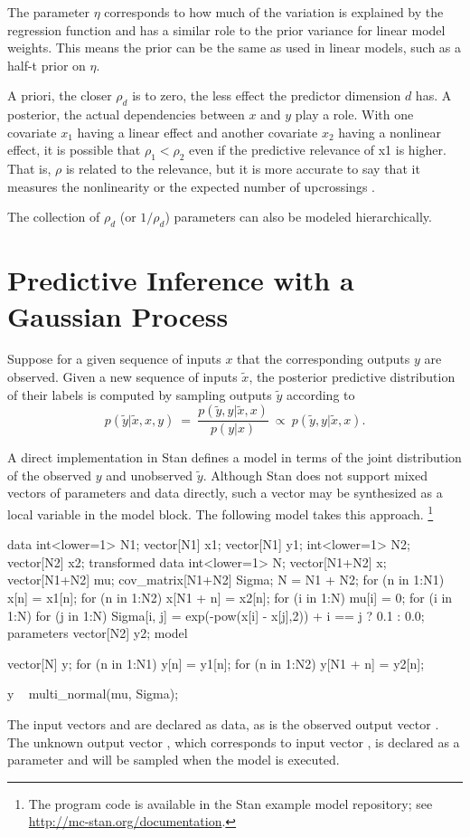 The parameter $\eta$ corresponds to how much of the variation is
explained by the regression function and has a similar role to the
prior variance for linear model weights.  This means the prior can be
the same as used in linear models, such as a half-t prior on $\eta$.

A priori, the closer $\rho_d$ is to zero, the less effect the
predictor dimension $d$ has.  A posterior, the actual dependencies
between $x$ and $y$ play a role.  With one covariate $x_1$ having a
linear effect and another covariate $x_2$ having a nonlinear effect,
it is possible that $\rho_1 < \rho_2$ even if the predictive relevance
of x1 is higher. That is, $\rho$ is related to the relevance, but it
is more accurate to say that it measures the nonlinearity or the
expected number of upcrossings \cite[page~80]{RasmussenWilliams:2006}.

The collection of $\rho_d$ (or $1/\rho_d$) parameters can also be
modeled hierarchically.


\section{Predictive Inference with a Gaussian Process}

Suppose for a given sequence of inputs $x$ that the corresponding
outputs $y$ are observed.  Given a new sequence of inputs $\tilde{x}$,
the posterior predictive distribution of their labels is computed by
sampling outputs $\tilde{y}$ according to
\[
p(\tilde{y}|\tilde{x},x,y)
\ = \
\frac{p(\tilde{y}, y|\tilde{x},x)}
     {p(y|x)}
\ \propto \
p(\tilde{y}, y|\tilde{x},x).
\]

A direct implementation in Stan defines a model in terms of the
joint distribution of the observed $y$ and unobserved $\tilde{y}$.
Although Stan does not support mixed vectors of parameters and data
directly, such a vector may be synthesized as a local variable in the
model block.  The following model takes this approach.%
%
\footnote{The program code is available in the Stan example model repository;
see \url{http://mc-stan.org/documentation}.}
%
\begin{stancode}
data {
  int<lower=1> N1;     
  vector[N1] x1; 
  vector[N1] y1;
  int<lower=1> N2;
  vector[N2] x2;
}
transformed data {
  int<lower=1> N;
  vector[N1+N2] x;
  vector[N1+N2] mu;
  cov_matrix[N1+N2] Sigma;
  N = N1 + N2;
  for (n in 1:N1) x[n] = x1[n];
  for (n in 1:N2) x[N1 + n] = x2[n];
  for (i in 1:N) mu[i] = 0;
  for (i in 1:N) 
    for (j in 1:N)
      Sigma[i, j] = exp(-pow(x[i] - x[j],2)) 
                    + i == j ? 0.1 : 0.0;
}
parameters {
  vector[N2] y2;
}
model {
  vector[N] y;
  for (n in 1:N1) y[n] = y1[n];
  for (n in 1:N2) y[N1 + n] = y2[n];

  y ~ multi_normal(mu, Sigma);
}
\end{stancode}
%
The input vectors  and  are declared as data, as is
the observed output vector .  The unknown output vector
\code{y2}, which corresponds to input vector \code{x2}, is declared as
a parameter and will be sampled when the model is executed.  

